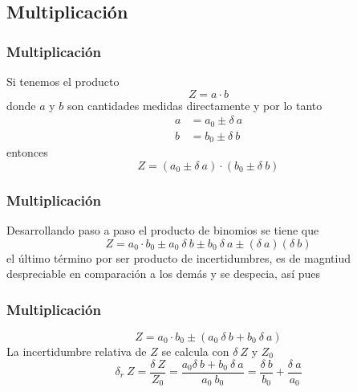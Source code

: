 \subsection*{Multiplicación}
\begin{frame}
\frametitle{Multiplicación}
Si tenemos el producto
\[ Z = a \cdot b \]
donde $a$ y $b$ son cantidades medidas directamente y por lo tanto
\pause
\begin{align*}
a &= a_{0} \pm \delta \: a \\
b &= b_{0} \pm \delta \: b
\end{align*}
entonces
\[ Z = (a_{0} \pm \delta \: a) \cdot (b_{0} \pm \delta \: b) \]
\end{frame}
\begin{frame}
\frametitle{Multiplicación}
Desarrollando paso a paso el producto de binomios se tiene que
 \[ Z = a_{0} \cdot b_{0} \pm a_{0} \: \delta \: b  \pm b_{0} \: \delta \: a \pm (\delta \: a)(\delta \: b) \]
el último término por ser producto de incertidumbres, es de magntiud despreciable en comparación a los demás y se despecia, así pues
\end{frame}
\begin{frame}
\frametitle{Multiplicación}
\[ Z = a_{0} \cdot b_{0} \pm (a_{0} \: \delta \: b + b_{0} \: \delta \: a) \]
\pause
La incertidumbre relativa de $Z$ se calcula con $\delta \: Z$ y $Z_{0}$
\[	\delta_{r} \: Z = \dfrac{\delta\: Z}{Z_{0}} = \dfrac{a_{0} \delta \: b + b_{0} \: \delta \: a}{a_{0} \: b_{0}} = \dfrac{\delta \: b}{b_{0}} + \dfrac{\delta \: a}{a_{0}} \]
\end{frame}
